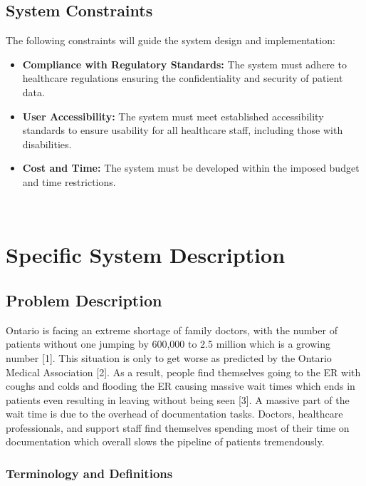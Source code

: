 \documentclass[12pt]{article}
\begin{document}
\subsection{System Constraints}

The following constraints will guide the system design and implementation:

\begin{itemize} 

  \item \textbf{Compliance with Regulatory Standards:} The system must adhere to healthcare regulations ensuring the confidentiality and security of patient data.

  \item \textbf{User Accessibility:} The system must meet established accessibility standards to ensure usability for all healthcare staff, including those with disabilities.

  \item \textbf{Cost and Time:} The system must be developed within the imposed budget and time restrictions.

\end{itemize}


~\newpage

\section{Specific System Description} \label{sec_SpecificSystemDescription}


\subsection{Problem Description} \label{sec_ProblemDescription}

Ontario is facing an extreme shortage of family doctors, with the number of patients without one jumping by 600,000 to 2.5 million which is a growing number [1]. This situation is only to get worse as predicted by the Ontario Medical Association [2]. As a result, people find themselves going to the ER with coughs and colds and flooding the ER causing massive wait times which ends in patients even resulting in leaving without being seen [3]. A massive part of the wait time is due to the overhead of documentation tasks. Doctors, healthcare professionals, and support staff find themselves spending most of their time on documentation which overall slows the pipeline of patients tremendously.


\subsubsection{Terminology and Definitions} \label{sec_TerminologyDefinitions}
\end{document}
